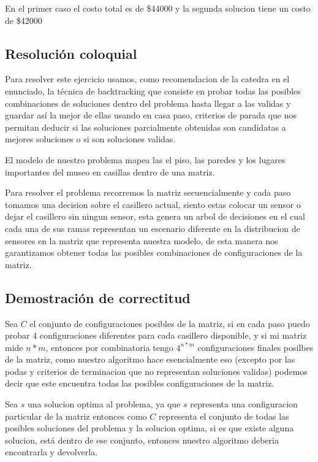 En el primer caso el costo total es de \$44000 y la segunda solucion tiene un costo de \$42000

\subsection{Resolución coloquial}

Para resolver este ejercicio usamos, como recomendacion de la catedra en el enunciado, la técnica de backtracking que consiste en probar todas las posibles combinaciones de soluciones dentro del problema hasta llegar a las validas y guardar así la mejor de ellas usando en casa paso, criterios de parada que nos permitan deducir si las soluciones parcialmente obtenidas son candidatas a mejores soluciones o si son soluciones validas.

El modelo de nuestro problema mapea las el piso, las paredes y los lugares importantes del museo en casillas dentro de una matriz.

Para resolver el problema recorremos la matriz secuencialmente y cada paso tomamos una decision sobre el casillero actual, siento estas colocar un sensor o dejar el casillero sin ningun sensor, esta genera un arbol de decisiones en el cual cada una de sus ramas representan un escenario diferente en la distribucion de sensores en la matriz que representa nuestra modelo, de esta manera nos garantizamos obtener todas las posibles combinaciones de configuraciones de la matriz.

\subsection{Demostración de correctitud}

Sea $C$ el conjunto de configuraciones posibles de la matriz, si en cada paso puedo probar 4 configuraciones diferentes para cada casillero disponible, y si mi matriz mide $n*m$, entonces por combinatoria tengo $4^{n*m}$ configuraciones finales posilbes de la matriz, como nuestro algoritmo hace esencialmente eso (excepto por las podas y criterios de terminacion que no representan soluciones validas) podemos decir que este encuentra todas las posibles configuraciones de la matriz.

Sea $s$ una solucion optima al problema, ya que $s$ representa una configuracion particular de la matriz entonces como $C$ representa el conjunto de todas las posibles soluciones del problema y la solucion optima, si es que existe alguna solucion, está dentro de ese conjunto, entonces nuestro algoritmo deberia encontrarla y devolverla.

